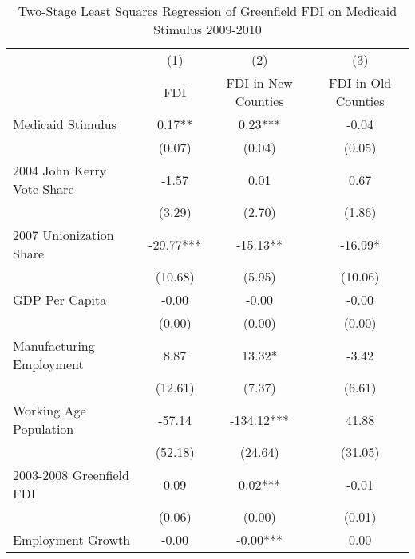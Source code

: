 \begin{table}[!htbp]\centering
\def\sym#1{\ifmmode^{#1}\else\(^{#1}\)\fi}
\caption{Two-Stage Least Squares Regression of Greenfield FDI on Medicaid Stimulus 2009-2010}
\begin{tabular}{l*{3}{c}}
\hline\hline
                    &\multicolumn{1}{c}{(1)}   &\multicolumn{1}{c}{(2)}   &\multicolumn{1}{c}{(3)}   \\
                    &                 FDI   & FDI in New Counties   & FDI in Old Counties   \\
\hline
Medicaid Stimulus   &                0.17** &                0.23***&               -0.04   \\
                    &              (0.07)   &              (0.04)   &              (0.05)   \\
2004 John Kerry Vote Share&               -1.57   &                0.01   &                0.67   \\
                    &              (3.29)   &              (2.70)   &              (1.86)   \\
2007 Unionization Share&              -29.77***&              -15.13** &              -16.99*  \\
                    &             (10.68)   &              (5.95)   &             (10.06)   \\
GDP Per Capita      &               -0.00   &               -0.00   &               -0.00   \\
                    &              (0.00)   &              (0.00)   &              (0.00)   \\
Manufacturing Employment&                8.87   &               13.32*  &               -3.42   \\
                    &             (12.61)   &              (7.37)   &              (6.61)   \\
Working Age Population&              -57.14   &             -134.12***&               41.88   \\
                    &             (52.18)   &             (24.64)   &             (31.05)   \\
2003-2008 Greenfield FDI&                0.09   &                0.02***&               -0.01   \\
                    &              (0.06)   &              (0.00)   &              (0.01)   \\
Employment Growth   &               -0.00   &               -0.00***&                0.00   \\

\end{tabular}
\end{table}
